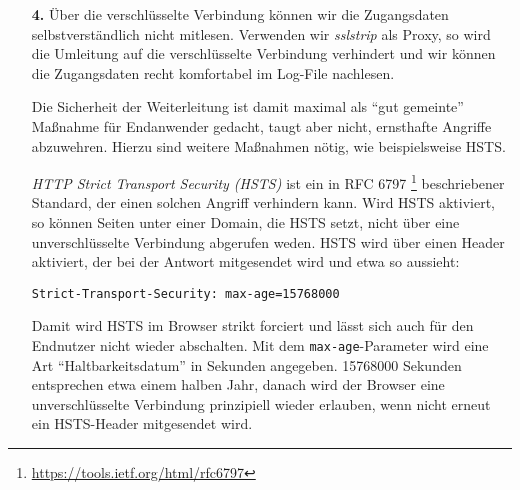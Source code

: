 \documentclass[a4paper,12bpt]{scrartcl}
\begin{document}
\begin{enumerate}
        \begin{lstlisting}
RewriteEngine On
RewriteCond %{HTTPS} !=on
RewriteRule ^/?(.*) https://%{SERVER_NAME}/$1 [R,L]
        \end{lstlisting}

        Mit dem ersten Befehl wird die Bearbeitung der Rewrite-Regeln eingeschaltet.
        Danach wird geprüft, ob nicht bereits HTTPS verwendet wird, da damit die
        Weiterleitung hinfällig wird. Schließlich wird die Rewrite-Regel definiert,
        die dann weiterleitet. Die Optionen am Ende sind die Flags. \texttt{L}
        gibt an, dass die Regel die letzte ist, die ausgeführt wird. \texttt{R}
        spezifiziert, dass ein HTTP Redirect passieren soll.

        Die Regel selbst ist ein regulärer Ausdruck, bei dem alles nach einem
        optionalen ``\texttt{/}'' matched und in die HTTPS-URL eingesetzt wird.

    \item[\bfseries 4.]
        Über die verschlüsselte Verbindung können wir die Zugangsdaten
        selbstverständlich nicht mitlesen. Verwenden wir \textit{sslstrip} als
        Proxy, so wird die Umleitung auf die verschlüsselte Verbindung verhindert
        und wir können die Zugangsdaten recht komfortabel im Log-File nachlesen.

        Die Sicherheit der Weiterleitung ist damit maximal als ``gut gemeinte''
        Maßnahme für Endanwender gedacht, taugt aber nicht, ernsthafte Angriffe
        abzuwehren. Hierzu sind weitere Maßnahmen nötig, wie beispielsweise HSTS.

        \textit{HTTP Strict Transport Security (HSTS)} ist ein in RFC 6797%
        \footnote{\url{https://tools.ietf.org/html/rfc6797}} beschriebener
        Standard, der einen solchen Angriff verhindern kann. Wird HSTS aktiviert,
        so können Seiten unter einer Domain, die HSTS setzt, nicht über eine
        unverschlüsselte Verbindung abgerufen weden.
        HSTS wird über einen Header aktiviert, der bei der Antwort mitgesendet
        wird und etwa so aussieht:

        \begin{lstlisting}
Strict-Transport-Security: max-age=15768000
        \end{lstlisting}

        Damit wird HSTS im Browser strikt forciert und lässt sich auch für
        den Endnutzer nicht wieder abschalten.
        Mit dem \texttt{max-age}-Parameter wird eine Art ``Haltbarkeitsdatum''
        in Sekunden angegeben. 15768000 Sekunden entsprechen etwa einem halben
        Jahr, danach wird der Browser eine unverschlüsselte Verbindung prinzipiell
        wieder erlauben, wenn nicht erneut ein HSTS-Header mitgesendet wird.
\end{enumerate}
\end{document}
